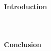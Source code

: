 \documentclass{article}
\begin{document}
\vspace{2cm}
\textbf{\LARGE \\Introduction}
\\\\

\vspace{2cm}
\section{\Large }

\vspace{2cm}
\textbf{\LARGE Conclusion}
\\\\

\end{document}
